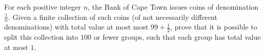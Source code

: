 For each positive integer $n$,  the Bank of Cape Town issues coins of denomination $\frac1n$. Given a finite collection of such coins (of not necessarily different denominations) with total value at most most $99+\frac12$,  prove that it is possible to split this collection into $100$ or fewer groups, such that each group has total value at most $1$.